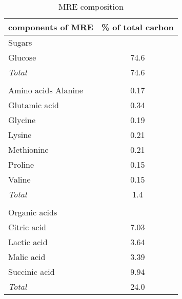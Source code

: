 
 \begin{table}[H]
    \centering
    \caption{MRE composition}
    \label{MRE_composition}
    \begin{tabular}{l@{\hskip 1in}c} 
    	
        \toprule
        components of MRE & \% of total carbon\\
        \midrule
        Sugars\\
        Glucose           &  74.6\\
        \textit{Total}    &  74.6\\\\
        Amino acids
        Alanine           &  0.17\\
        Glutamic acid     &  0.34\\
        Glycine           &  0.19\\
        Lysine            &  0.21\\
        Methionine        &  0.21\\
        Proline           &  0.15\\
        Valine            &  0.15\\
        \textit{Total}    &  1.4\\\\
        Organic acids\\
        Citric acid       &  7.03\\          
        Lactic acid       &  3.64\\
        Malic acid        &  3.39\\
        Succinic acid     &  9.94\\
        \textit{Total}    &  24.0\\
        \bottomrule
                  
    \end{tabular}

\end{table}

